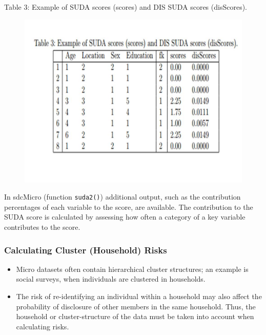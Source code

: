 \documentclass{beamer}
\begin{document}
	\begin{frame}
		Table 3: Example of SUDA scores (scores) and DIS SUDA scores (disScores).
		\begin{figure}
\centering
\includegraphics[width=0.99\linewidth]{JPEGS/TemplTable3}
\caption{}
\label{fig:TemplTable3}
\end{figure}

	\end{frame}
	\begin{frame}
		In sdcMicro (function \texttt{suda2()}) additional output, such as the contribution
		percentages of each variable to the score, are available. The contribution to the
		SUDA score is calculated by assessing how often a category of a key variable
		contributes to the score.
	\end{frame}
	\begin{frame}
		\frametitle{Calculating Cluster (Household) Risks}
		\begin{itemize}
			\item Micro datasets often contain hierarchical cluster structures; an example is social
			surveys, when individuals are clustered in households. 
			\item The risk of re-identifying
			an individual within a household may also affect the probability of disclosure of
			other members in the same household. Thus, the household or cluster-structure of
			the data must be taken into account when calculating risks.
\end{itemize}
	\end{frame}
\end{document}
